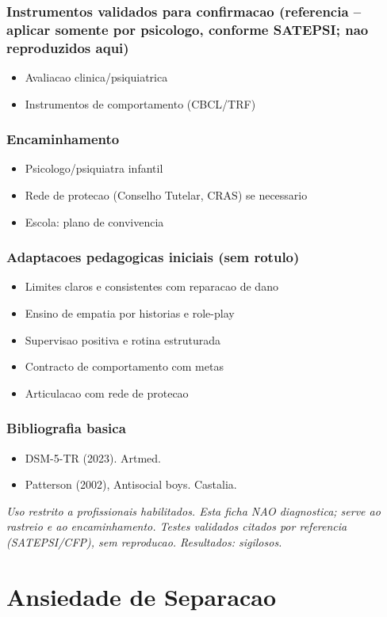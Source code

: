 \documentclass[a4paper,11pt]{book}
\newcommand{\avisolegal}{\par\medskip\noindent\footnotesize\itshape
\color{cinza}Uso restrito a profissionais habilitados. Esta ficha NAO diagnostica;
serve ao rastreio e ao encaminhamento. Testes validados citados por referencia
(SATEPSI/CFP), sem reproducao. Resultados: sigilosos.\color{black}\par}
\begin{document}
\subsection*{Instrumentos validados para confirmacao (referencia -- aplicar somente por psicologo, conforme SATEPSI; nao reproduzidos aqui)}
\begin{itemize}
\item Avaliacao clinica/psiquiatrica
\item Instrumentos de comportamento (CBCL/TRF)
\end{itemize}
\subsection*{Encaminhamento}
\begin{itemize}
\item Psicologo/psiquiatra infantil
\item Rede de protecao (Conselho Tutelar, CRAS) se necessario
\item Escola: plano de convivencia
\end{itemize}
\subsection*{Adaptacoes pedagogicas iniciais (sem rotulo)}
\begin{itemize}
\item Limites claros e consistentes com reparacao de dano
\item Ensino de empatia por historias e role-play
\item Supervisao positiva e rotina estruturada
\item Contracto de comportamento com metas
\item Articulacao com rede de protecao
\end{itemize}
\subsection*{Bibliografia basica}
\begin{itemize}
\item DSM-5-TR (2023). Artmed.
\item Patterson (2002), Antisocial boys. Castalia.
\end{itemize}
\avisolegal


\chapter{Ansiedade de Separacao}
\end{document}
